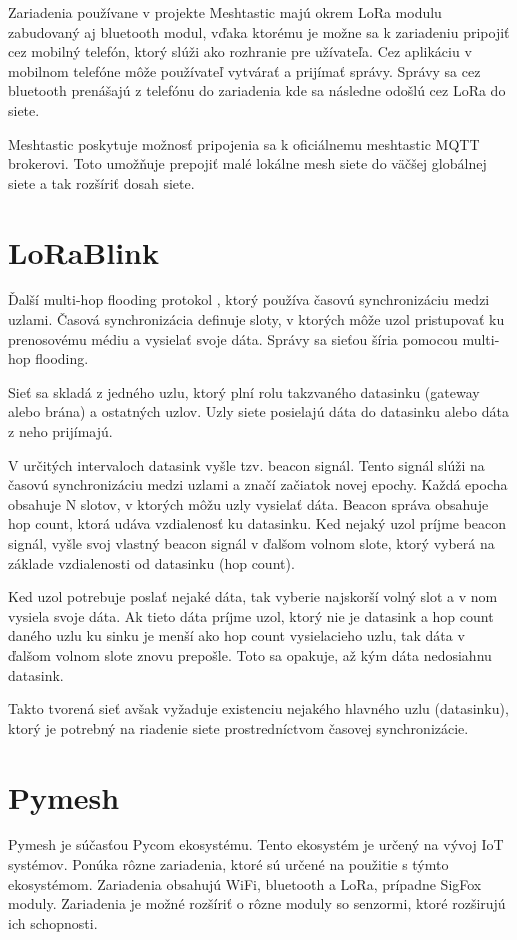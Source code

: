 \documentclass[slovak,master]{diploma}
\begin{document}
Zariadenia používane v projekte Meshtastic majú okrem LoRa modulu zabudovaný aj bluetooth modul, vďaka ktorému je možne sa k zariadeniu pripojiť cez mobilný telefón, ktorý slúži ako rozhranie pre 
užívateľa. Cez aplikáciu v mobilnom telefóne môže používateľ vytvárať a prijímať správy. Správy sa cez bluetooth prenášajú z telefónu do zariadenia kde sa následne odošlú cez 
LoRa do siete.

Meshtastic poskytuje možnosť pripojenia sa k oficiálnemu meshtastic MQTT brokerovi. Toto umožňuje prepojiť malé lokálne mesh siete do väčšej globálnej siete a 
tak rozšíriť dosah siete.

\section{LoRaBlink}
Ďalší multi-hop flooding protokol \cite{lorablink}, ktorý používa časovú synchronizáciu medzi uzlami. Časová synchronizácia definuje sloty, v ktorých môže uzol pristupovať ku prenosovému médiu a 
vysielať svoje dáta. Správy sa sieťou šíria pomocou multi-hop flooding.

Sieť sa skladá z jedného uzlu, ktorý plní rolu takzvaného datasinku (gateway alebo brána) a ostatných uzlov. Uzly siete posielajú dáta do datasinku alebo dáta z neho prijímajú.

V určitých intervaloch datasink vyšle tzv. beacon signál. Tento signál slúži na časovú synchronizáciu medzi uzlami a značí začiatok novej epochy. 
Každá epocha obsahuje N slotov, v ktorých môžu uzly vysielať dáta. Beacon správa obsahuje hop count, ktorá udáva vzdialenosť ku datasinku.
Ked nejaký uzol príjme beacon signál, vyšle svoj vlastný beacon signál v ďalšom volnom slote, ktorý vyberá na základe vzdialenosti od datasinku (hop count).

Ked uzol potrebuje poslať nejaké dáta, tak vyberie najskorší volný slot a v nom vysiela svoje dáta. Ak tieto dáta príjme uzol, ktorý nie je datasink a 
hop count daného uzlu ku sinku je menší ako hop count vysielacieho uzlu, tak dáta v ďalšom volnom slote znovu prepošle. Toto sa opakuje, až 
kým dáta nedosiahnu datasink.

Takto tvorená sieť avšak vyžaduje existenciu nejakého hlavného uzlu (datasinku), ktorý je potrebný na riadenie siete prostredníctvom časovej synchronizácie.

\section{Pymesh}
Pymesh je súčasťou Pycom \cite{pycom} ekosystému. Tento ekosystém je určený na vývoj IoT systémov. Ponúka rôzne zariadenia, ktoré sú určené na použitie s týmto 
ekosystémom. Zariadenia obsahujú WiFi, bluetooth a LoRa, prípadne SigFox moduly. Zariadenia je možné rozšíriť o rôzne moduly so senzormi, ktoré rozširujú ich schopnosti.
\end{document}
